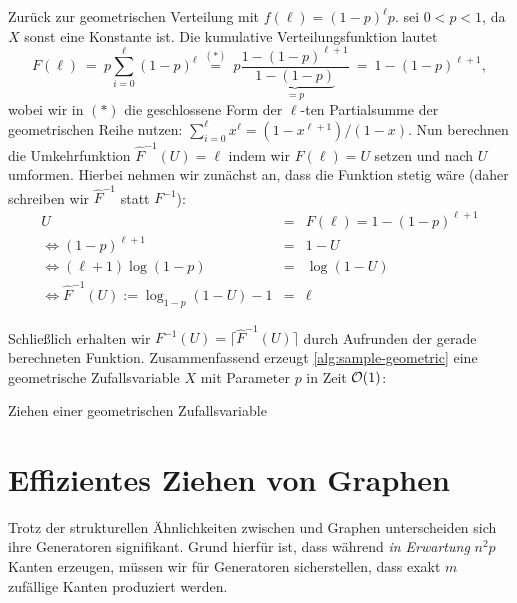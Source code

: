 Zurück  zur geometrischen Verteilung mit $f(\ell) = (1-p)^\ell p$.
\OBdA sei $0 < p < 1$, da $X$ sonst eine Konstante ist.
Die kumulative Verteilungsfunktion lautet
\begin{equation}
    F(\ell)
    \ =\ p \sum_{i=0}^\ell (1-p)^\ell
    \ \stackrel{(*)}{=} \ p \frac{1 - (1-p)^{\ell+1}}{\underbrace{1 - (1-p)}_{=p}}
    \ = \ 1 - (1-p)^{\ell+1},
\end{equation}
wobei wir in $(*)$ die geschlossene Form der $\ell$-ten Partialsumme der geometrischen Reihe nutzen: $\sum_{i=0}^\ell x^\ell = (1 - x^{\ell+1})/(1 - x)$.
Nun berechnen die Umkehrfunktion $\hat F^{-1}(U) = \ell$ indem wir $F(\ell) = U$ setzen und nach $U$ umformen.
Hierbei nehmen wir zunächst an, dass die Funktion stetig wäre (daher schreiben wir $\hat F ^{-1}$ statt $F^{-1}$):
\begin{eqnarray}
    U &=& F(\ell) = 1 - (1-p)^{\ell+1} \\
    \Leftrightarrow (1-p)^{\ell+1} &=& 1 - U \\
    \Leftrightarrow  (\ell+1) \log(1-p)  &=& \log(1 - U) \\
    \Leftrightarrow  \hat F^{-1}(U) := \log_{1-p}(1 - U) - 1 &=& \ell \label{eq:inverse-hat}
\end{eqnarray}

Schließlich erhalten wir $F^{-1}(U) = \lceil \hat F^{-1} (U) \rceil$ durch Aufrunden der gerade berechneten Funktion.
Zusammenfassend erzeugt \cref{alg:sample-geometric} eine geometrische Zufallsvariable $X$ mit Parameter $p$ in Zeit $\mathcal{O}\!\left(1\right)$:

\begin{algorithm}[H]
    \Else{$U \gets \text{ziehe uniform aus $[0, 1)$}$\;
    Gebe $\lceil \log_{1-p}(1 - U) - 1\rceil$ zurück}
    \caption{Ziehen einer geometrischen Zufallsvariable}
    \label{alg:sample-geometric}
\end{algorithm}

\bigskip
\bigskip

\section{Effizientes Ziehen von \Gnm Graphen}\label{sec:sampling_gnm}
Trotz der strukturellen Ähnlichkeiten zwischen \Gnp und \Gnm Graphen unterscheiden sich ihre Generatoren signifikant.
Grund hierfür ist, dass während \Gnp \emph{in Erwartung} $n^2p$ Kanten erzeugen, müssen wir für \Gnm Generatoren sicherstellen, dass exakt $m$ zufällige Kanten produziert werden.

